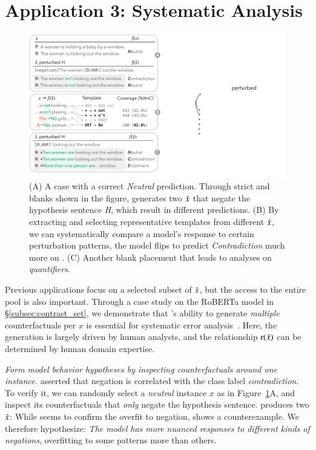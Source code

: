 \section{Application 3: Systematic Analysis}
\label{sec:app_err_analysis}


\begin{figure}[t]
\centering
\includegraphics[trim={0 1cm 33cm 0cm},clip,width=1\columnwidth]{figures/err_analysis.pdf}
\vspace{-15pt}
\caption{
(A) A \nli case with a correct \emph{Neutral} prediction.
Through strict \tagstrs and blanks shown in the figure, \sysname generates two $\hat{x}$ that negate the hypothesis sentence \emph{H}, which result in different predictions.
(B) By extracting and selecting representative templates from different $\hat{x}$, we can systematically compare a model's response to certain perturbation patterns, \eg the model flips to predict \emph{Contradiction} much more on .
(C) Another blank placement that leads to analyses on \emph{quantifiers}.
}
\vspace{-10pt}
\label{fig:err_analysis}
\end{figure}


Previous applications focus on a selected subset of $\hat{x}$, but the access to the entire pool is also important.
Through a case study on the \nli RoBERTa model in \S\ref{subsec:contrast_set}, we demonstrate that \sysname's ability to generate \emph{multiple} counterfactuals per $x$ is essential for systematic error analysis~\cite{wu2019errudite}.
Here, the generation is largely driven by human analysts, and the relationship $\operatorname*{r}(\hat{x})$ can be determined by human domain expertise.


\emph{Form model behavior hypotheses by inspecting counterfactuals around one instance.}
\citet{gururangan2018annotation} asserted that negation is correlated with the class label \emph{contradiction}. 
To verify it, we can randomly select a \emph{neutral} instance $x$ as in Figure~\ref{fig:err_analysis}A, and inspect its counterfactuals that \emph{only} negate the hypothesis sentence.
\sysname produces two $\hat{x}$:
While  seems to confirm the overfit to negation,  shows a counterexample. 
We therefore hypothesize: 
\emph{The model has more nuanced responses to different kinds of negations}, overfitting to some patterns more than others.

